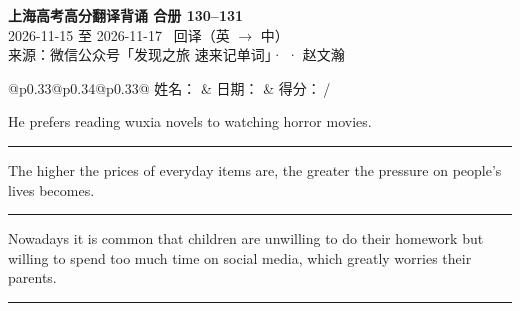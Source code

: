 \documentclass[11pt,a4paper]{article}
\newcommand{\num}[1]{\makebox[1.9em][r]{#1.}\hspace{0.3em}}
\newcommand{\wline}{\noindent\rule{\linewidth}{0.4pt}}
\begin{document}
\pagestyle{plain}
\begin{center}
{\LARGE\bfseries 上海高考高分翻译背诵 \quad 合册 130–131}\\[0.25em]
{\large 2026-11-15 至 2026-11-17 \quad\ 回译（英 $\to$ 中）}\\[0.35em]
{\footnotesize 来源：微信公众号「发现之旅 速来记单词」·  · 赵文瀚}
\end{center}

\vspace{0.4em}
\noindent\begin{tabular}{@{}p{0.33\textwidth}@{}p{0.34\textwidth}@{}p{0.33\textwidth}@{}}
姓名：\underline{\hspace{2.0cm}} & 日期：\underline{\hspace{2.0cm}} & 得分：\underline{\hspace{1.4cm}}\,/ \\
\end{tabular}

\vspace{0.5em}

\vspace{0.8em}
\vspace{0.35em}\vspace{0.15em}

\begin{minipage}{\linewidth}

\num{1}He prefers reading wuxia novels to watching horror movies.

\vspace{0.25em}

\wline

\end{minipage}

\begin{minipage}{\linewidth}

\num{2}The higher the prices of everyday items are, the greater the pressure on people’s lives becomes.

\vspace{0.25em}

\wline

\end{minipage}

\begin{minipage}{\linewidth}

\num{3}Nowadays it is common that children are unwilling to do their homework but willing to spend too much time on social media, which greatly worries their parents.

\vspace{0.25em}

\wline

\end{minipage}
\end{document}
